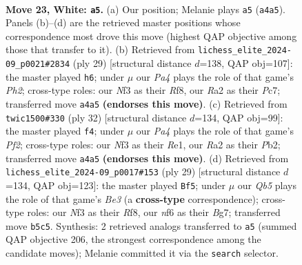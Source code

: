 \documentclass[11pt]{article}
\begin{document}
\begin{figure}[p]
\label{fig:thought-m42}
\end{figure}

\clearpage

\begin{figure}[p]\centering
\begin{subfigure}{0.46\textwidth}\centering
\resizebox{\linewidth}{!}{%
\newchessgame
\chessboard[
  setfen={rnb3k1/pp2qpb1/3rpnp1/1Q1p3p/P2P3P/1B2BNP1/RPP2P2/1N2R1K1 w - - 9 23},
  showmover=false,
  pgfstyle=straightmove, color=movearrow, markmove={a4-a5}
]}
\caption{}
\end{subfigure}\hfill
\begin{subfigure}{0.46\textwidth}\centering
\resizebox{\linewidth}{!}{%
\newchessgame
\chessboard[
  setfen={r4rk1/1ppqbppp/p2p1nb1/8/3NPPP1/1PNQ3P/PBP5/R4RK1 b - - 0 15},
  showmover=false,
  pgfstyle=straightmove, color=movearrow, markmove={h7-h6}
]}
\caption{}
\end{subfigure}
\\[4pt]
\begin{subfigure}{0.46\textwidth}\centering
\resizebox{\linewidth}{!}{%
\newchessgame
\chessboard[
  setfen={r2r1nk1/p3q1bp/2p2pp1/Ppp1p3/4P3/3PB1QP/1PPN1PP1/R3R1K1 w - - 2 17},
  showmover=false,
  pgfstyle=straightmove, color=movearrow, markmove={f2-f4}
]}
\caption{}
\end{subfigure}\hfill
\begin{subfigure}{0.46\textwidth}\centering
\resizebox{\linewidth}{!}{%
\newchessgame
\chessboard[
  setfen={r4rk1/1p2ppb1/pqp1bnpp/8/1PPPp2P/4P1B1/P1QNBPP1/1R2K2R b K - 1 15},
  showmover=false,
  pgfstyle=straightmove, color=movearrow, markmove={e6-f5}
]}
\caption{}
\end{subfigure}
\caption{\textbf{Move 23, White: \texttt{a5}.} (a) Our position; Melanie plays \texttt{a5} (\texttt{a4a5}). Panels (b)--(d) are the retrieved master positions whose correspondence most drove this move (highest QAP objective among those that transfer to it). (b) Retrieved from \texttt{lichess\_elite\_2024-09\_p0021\#2834} (ply 29) [structural distance $d$=138, QAP obj=107]: the master played \texttt{h6}; under $\mu$ our \emph{Pa4} plays the role of that game's \emph{Ph2}; cross-type roles: our \emph{N}f3 as their \emph{R}f8, our \emph{R}a2 as their \emph{P}c7; transferred move \texttt{a4a5} \textbf{(endorses this move)}. (c) Retrieved from \texttt{twic1500\#330} (ply 32) [structural distance $d$=134, QAP obj=99]: the master played \texttt{f4}; under $\mu$ our \emph{Pa4} plays the role of that game's \emph{Pf2}; cross-type roles: our \emph{N}f3 as their \emph{R}e1, our \emph{R}a2 as their \emph{P}b2; transferred move \texttt{a4a5} \textbf{(endorses this move)}. (d) Retrieved from \texttt{lichess\_elite\_2024-09\_p0017\#153} (ply 29) [structural distance $d$=134, QAP obj=123]: the master played \texttt{Bf5}; under $\mu$ our \emph{Qb5} plays the role of that game's \emph{Be3} (a \textbf{cross-type} correspondence); cross-type roles: our \emph{N}f3 as their \emph{R}f8, our \emph{n}f6 as their \emph{B}g7; transferred move \texttt{b5c5}. Synthesis: 2 retrieved analogs transferred to \texttt{a5} (summed QAP objective 206, the strongest correspondence among the candidate moves); Melanie committed it via the \texttt{search} selector.}

\end{figure}
\end{document}

